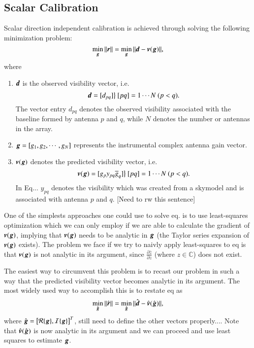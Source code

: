 \documentclass[a4paper,fleqn,usenatbib]{mnras}
\newcommand{\br}{\bmath{r}}
\newcommand{\bg}{\bmath{g}}
\newcommand{\bd}{\bmath{d}}
\newcommand{\bv}{\bmath{v}}
\newcommand{\conj}[1]{\overline{#1}}
\begin{document}
\subsection{Scalar Calibration}
Scalar direction independent calibration is achieved through solving the following minimization problem:
\begin{equation}
\min_{\bg}\|\br\| = \min_{\bg}\|\bd - \bv(\bg)\|, 
\end{equation}
where
\begin{enumerate}
 \item $\bd$ is the observed visibility vector, i.e. 
 \begin{equation}
  \bd = [d_{pq}] \big \} ~ [pq] = 1\cdots N ~ (p<q).
 \end{equation}
 The vector entry $d_{pq}$ denotes the observed visibility associated with the baseline formed by antenna $p$ and $q$, while $N$ denotes the number or antennas
 in the array. 
 \item $\bg = [g_1,g_2,\cdots,g_N]$ represents the instrumental complex antenna gain vector.
 \item $\bv(\bg)$ denotes the predicted visibility vector, i.e.
 \begin{equation}
  \bv(\bg) = [g_p y_{pq}\conj{g}_q]  \big \} ~ [pq] = 1\cdots N ~ (p<q).
 \end{equation}
 In Eq... $y_{pq}$ denotes the visibility which was created from a skymodel and is associated with antenna $p$ and $q$. [Need to rw this sentence] 
\end{enumerate}

One of the simplests approaches one could use to solve eq. is to use least-squares optimization which we can only employ if we are able to calculate the gradient of $\bv(\bg)$,
implying that $\bv(\bg)$ needs to be analytic in $\bg$ (the Taylor series expansion of $\bv(\bg)$ exists).
The problem we face if we try to naivly apply least-squares to eq is that $\bv(\bg)$ is not analytic in its argument, since $\frac{\partial \conj{z}}{\partial z}$ (where 
$z \in \mathbb{C}$) does not exist.

The easiest way to circumvent this problem is to recast our problem in such a way that the predicted visibility vector becomes analytic in its argument.
The most widely used way to accomplish this is to restate eq as
\begin{equation}
\min_{\hat{\bg}}\|\hat{\br}\| = \min_{\hat{\bg}}\|\hat{\bd} - \hat{\bv}(\hat{\bg})\|, 
\end{equation}
where $\hat{\bg} = \big[\mathcal{R}\{\bg\},\mathcal{I}\{\bg\}\big]^T$, still need to define the other vectors properly....
Note that $\hat{\bv}(\hat{\bg})$ is now analytic in its argument and we can proceed and use least squares to estimate $\bg$. 
\end{document}
